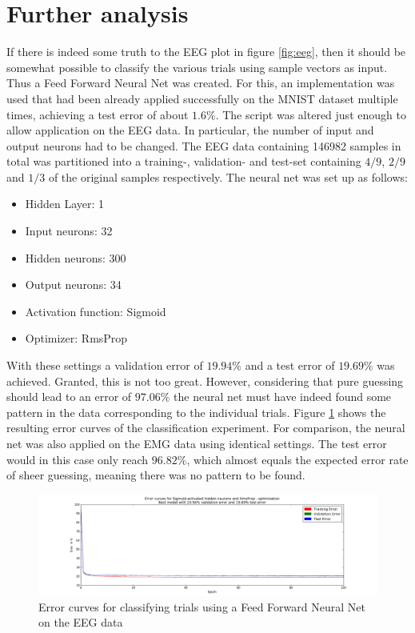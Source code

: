 \documentclass{article} %
\begin{document}
\section{Further analysis}
If there is indeed some truth to the EEG plot in figure \ref{fig:eeg}, then it should be somewhat possible to classify the various trials using sample vectors as input. Thus a Feed Forward Neural Net was created. For this, an implementation was used that had been already applied successfully on the MNIST dataset multiple times, achieving a test error of about $1.6\%$. The script was altered just enough to allow application on the EEG data. In particular, the number of input and output neurons had to be changed. The EEG data containing 146982 samples in total was partitioned into a training-, validation- and test-set containing $4/9$, $2/9$ and $1/3$ of the original samples respectively.
The neural net was set up as follows:
\begin{itemize}
	\item Hidden Layer: 1
	\item Input neurons: 32
	\item Hidden neurons: 300
	\item Output neurons: 34
	\item Activation function: Sigmoid
	\item Optimizer: RmsProp
\end{itemize}
With these settings a validation error of $19.94\%$ and a test error of $19.69\%$ was achieved. Granted, this is not too great. However, considering that pure guessing should lead to an error of $97.06\%$ the neural net must have indeed found some pattern in the data corresponding to the individual trials. Figure \ref{fig:nnerror} shows the resulting error curves of the classification experiment. For comparison, the neural net was also applied on the EMG data using identical settings. The test error would in this case only reach $96.82\%$, which almost equals the expected error rate of sheer guessing, meaning there was no pattern to be found.

\begin{figure}[h]
	\centering
	\hspace*{-1.7cm}
	\includegraphics[width=1.24\textwidth]{nnerror.png}
	\caption{Error curves for classifying trials using a Feed Forward Neural Net on the EEG data}
	\label{fig:nnerror}
\end{figure}
\end{document}
